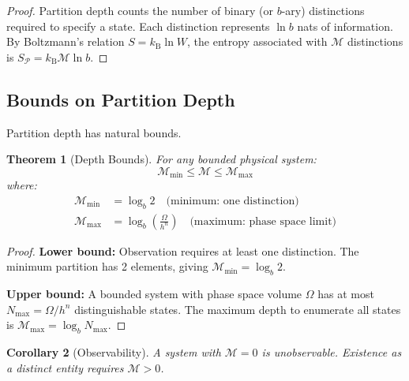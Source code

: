 \documentclass[twocolumn,10pt,a4paper]{article}
\newtheorem{theorem}{Theorem}[section]
\newtheorem{corollary}[theorem]{Corollary}
\theoremstyle{definition}
\theoremstyle{remark}
\newcommand{\kB}{k_{\mathrm{B}}}
\newcommand{\Depth}{\mathcal{M}}
\newcommand{\Part}{\mathcal{P}}
\begin{document}
\begin{proof}
Partition depth counts the number of binary (or $b$-ary) distinctions required to specify a state. Each distinction represents $\ln b$ nats of information. By Boltzmann's relation $S = \kB \ln W$, the entropy associated with $\Depth$ distinctions is $S_{\Part} = \kB \Depth \ln b$.
\end{proof}

\subsection{Bounds on Partition Depth}

Partition depth has natural bounds.

\begin{theorem}[Depth Bounds]
\label{thm:bounds}
For any bounded physical system:
\begin{equation}
    \Depth_{\min} \leq \Depth \leq \Depth_{\max}
\end{equation}
where:
\begin{align}
    \Depth_{\min} &= \log_b 2 \quad \text{(minimum: one distinction)} \\
    \Depth_{\max} &= \log_b\left(\frac{\Omega}{h^n}\right) \quad \text{(maximum: phase space limit)}
\end{align}
\end{theorem}

\begin{proof}
\textbf{Lower bound:} Observation requires at least one distinction. The minimum partition has 2 elements, giving $\Depth_{\min} = \log_b 2$.

\textbf{Upper bound:} A bounded system with phase space volume $\Omega$ has at most $N_{\max} = \Omega/h^n$ distinguishable states. The maximum depth to enumerate all states is $\Depth_{\max} = \log_b N_{\max}$.
\end{proof}

\begin{corollary}[Observability]
\label{cor:observe}
A system with $\Depth = 0$ is unobservable. Existence as a distinct entity requires $\Depth > 0$.
\end{corollary}
\end{document}
